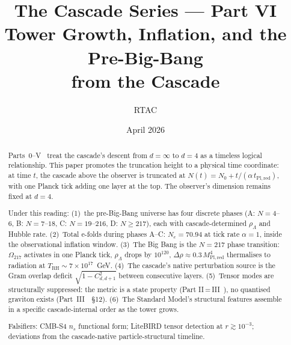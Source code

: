 \documentclass[12pt,a4paper]{article}
\title{\textbf{The Cascade Series --- Part VI}\\[6pt]
Tower Growth, Inflation, and the Pre-Big-Bang\\
from the Cascade}
\author{RTAC}
\date{April 2026}
\begin{document}
\setlength{\emergencystretch}{3em}
\maketitle
{}
\label{paperdoc}

\begin{center}
\end{center}

\begin{abstract}
Parts~0--V~\cite{part0,part1,part2,part3,part4a,part4b,part5} treat the cascade's descent from $d = \infty$ to $d = 4$ as a timeless logical relationship. This paper promotes the truncation height to a physical time coordinate: at time $t$, the cascade above the observer is truncated at $N(t) = N_0 + t/(\alpha\,t_{\mathrm{Pl,red}})$, with one Planck tick adding one layer at the top. The observer's dimension remains fixed at $d = 4$.

Under this reading: (1)~the pre-Big-Bang universe has four discrete phases (A: $N=4$--$6$, B: $N=7$--$18$, C: $N=19$--$216$, D: $N \geq 217$), each with cascade-determined $\rho_\Lambda$ and Hubble rate. (2)~Total e-folds during phases A--C: $N_e = 70.94$ at tick rate $\alpha = 1$, inside the observational inflation window. (3)~The Big Bang is the $N=217$ phase transition: $\Omega_{217}$ activates in one Planck tick, $\rho_\Lambda$ drops by $10^{120}$, $\Delta\rho \approx 0.3\,M_{\mathrm{Pl,red}}^4$ thermalises to radiation at $T_{\mathrm{RH}} \sim 7 \times 10^{17}$~GeV. (4)~The cascade's native perturbation source is the Gram overlap deficit $\sqrt{1 - C_{d,d+1}^2}$ between consecutive layers. (5)~Tensor modes are structurally suppressed: the metric is a state property (Part II\,=\,III~\cite{part23}), no quantised graviton exists (Part~III~\cite{part3}~\S12). (6)~The Standard Model's structural features assemble in a specific cascade-internal order as the tower grows.

Falsifiers: CMB-S4 $n_s$ functional form; LiteBIRD tensor detection at $r \gtrsim 10^{-3}$; deviations from the cascade-native particle-structural timeline.
\end{abstract}
\end{document}
